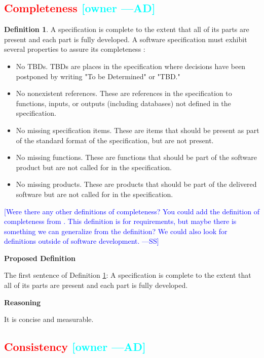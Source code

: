 \documentclass[letterpaper,cleveref]{lipics-v2019}
\newcommand{\authornote}[3]{\textcolor{#1}{[#3 ---#2]}}
\newcommand{\authornote}[3]{}
\newcommand{\wss}[1]{\authornote{blue}{SS}{#1}} %
\newcommand{\ad}[1]{\authornote{cyan}{AD}{#1}} %
\newcommand{\notdone}[1]{\textcolor{red}{#1}}
\theoremstyle{definition}
\newtheorem{defn}{Definition}
\begin{document}
\subsection{\notdone{Completeness} \ad{owner}}

\begin{defn}
\label{CompletenessSelected}
A specification is complete to the extent that all of its parts are present and
each part is fully developed. A software specification must exhibit several
properties to assure its completeness \citep{Boehm1984}:
\begin{itemize}
\item No TBDs. TBDs are places in the specification where decisions have been
postponed by writing "To be Determined" or "TBD."
\item No nonexistent references. These are references in the specification to
functions, inputs, or outputs (including databases) not defined in the
specification.
\item No missing specification items. These are items that should be present as
part of the standard format of the specification, but are not present.
\item No missing functions. These are functions that should be part of the
software product but are not called for in the specification.
\item No missing products. These are products that should be part of the
delivered software but are not called for in the specification.
\end{itemize}
\end{defn}

\wss{Were there any other definitions of completeness?  You could add the
  definition of completeness from \citet[p.\ 5--6]{IEEE1998}.  This definition is for
  requirements, but maybe there is something we can generalize from the
  definition?  We could also look for definitions outside of software development.}

\noindent \textbf{Proposed Definition} 

The first sentence of Definition \ref{CompletenessSelected}: A specification is
complete to the extent that all of its parts are present and each part is fully
developed.

\noindent \textbf{Reasoning}

It is concise and measurable.

\subsection{\notdone{Consistency} \ad{owner}}
\end{document}
